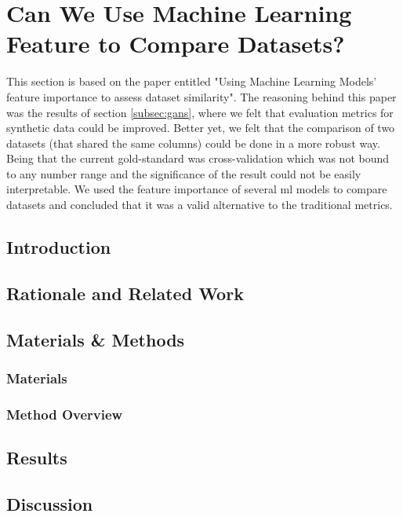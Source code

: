 



\section{Can We Use Machine Learning Feature to Compare Datasets?}\label{subsec:similarity}
This section is based on the paper entitled "Using Machine Learning Models' feature importance to assess dataset similarity". The reasoning behind this paper was the results of section \ref{subsec:gans}, where we felt that evaluation metrics for synthetic data could be improved. Better yet, we felt that the comparison of two datasets (that shared the same columns) could be done in a more robust way. Being that the current gold-standard was cross-validation which was not bound to any number range and the significance of the result could not be easily interpretable. We used the feature importance of several \ac{ml} models to compare datasets and concluded that it was a valid alternative to the traditional metrics.

\subsection{Introduction}

\subsection{Rationale and Related Work}

\subsection{Materials \& Methods}
\subsubsection{Materials}

\subsubsection{Method Overview}


\subsection{Results}

\subsection{Discussion}

